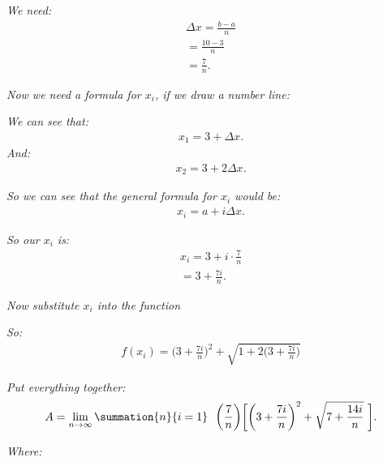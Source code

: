 \documentclass{report}
\begin{document}
\bigbreak \noindent 
\textit{We need:}
\begin{align*}
  \Delta x = \frac{b-a}{n} \\
  = \frac{10-3}{n} \\
  = \frac{7}{n}
.\end{align*}

\bigbreak \noindent \bigbreak \noindent 
\textit{Now we need a formula for $x_{i}$, if we draw a number line:}

\bigbreak \noindent 
\begin{figure}[ht]
  \centering
  \label{fig:deltax}
\end{figure}

\bigbreak \noindent 
\textit{We can see that:}
\begin{align*}
  x_{1} = 3 + \Delta x
.\end{align*}
\bigbreak \noindent 
\textit{And:}
\begin{align*}
  x_{2} = 3 + 2\Delta x
.\end{align*}

\bigbreak \noindent 
\textit{So we can see that the general formula for $x_{i}$ would be:}
\begin{align*}
  x_{i} = a + i \Delta x
.\end{align*}

\bigbreak \noindent 
\textit{So our $x_{i}$ is:}
\begin{align*}
  x_{i} = 3 + i \cdot \frac{7}{n} \\
  = 3 + \frac{7i}{n}
.\end{align*}

\bigbreak \noindent 
\textit{Now substitute $x_{i}$ into the function}

\bigbreak \noindent
\textit{So:}
\begin{align*}
  f(x_{i}) = \bigg(3+\frac{7i}{n}\bigg)^{2} + \sqrt{1+ 2\bigg(3 + \frac{7i}{n}\bigg)}
\end{align*}

\bigbreak \noindent 
\textit{Put everything together:}
\begin{align*}
  A = \lim\limits_{n \to \infty}{\summation{n}{i=1}\ \ \bigg(\frac{7}{n}\bigg)\bigg[\bigg(3+\frac{7i}{n}\bigg)^{2} + \sqrt{7+\frac{14i}{n}}\ \bigg]}
.\end{align*}

\bigbreak \noindent 
\textit{Where:}
\begin{figure}[ht]
  \centering
  \label{fig:figure1}
\end{figure}
\end{document}
